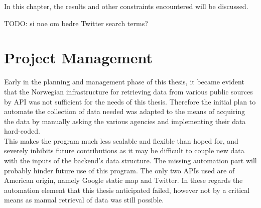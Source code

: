 
In this chapter, the results and other constraints encountered will be discussed.

TODO: si noe om bedre Twitter search terms?

\section{Project Management}

Early in the planning and management phase of this thesis, it became evident that the Norwegian infrastructure for retrieving data from various public sources by API was not sufficient for the needs of this thesis. Therefore the initial plan to automate the collection of data needed was adapted to the means of acquiring the data by manually asking the various agencies and implementing their data hard-coded.
\\
This makes the program much less scalable and flexible than hoped for, and severely inhibits future contributions as it may be difficult to couple new data with the inputs of the backend's data structure. The missing automation part will probably hinder future use of this program. The only two APIs used are of American origin, namely Google static map and Twitter. In these regards the automation element that this thesis anticipated failed, however not by a critical means as manual retrieval of data was still possible.






